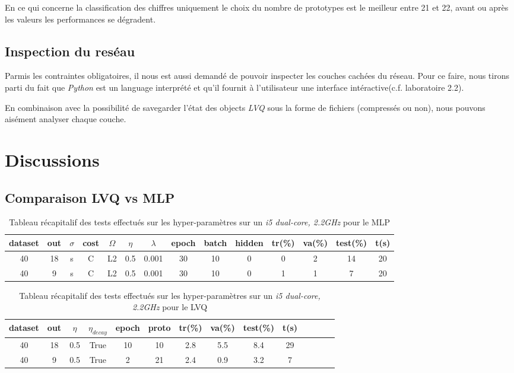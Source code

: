 \documentclass[11pt]{article}
\begin{document}
En ce qui concerne la classification des chiffres uniquement le choix
du nombre de prototypes est le meilleur entre 21 et 22, avant ou apr\`es les
valeurs les performances se d\'egradent.
\newpage

\subsection{Inspection du res\'eau}
Parmis les contraintes obligatoires, il nous est aussi demand\'e de pouvoir
inspecter les couches cach\'ees du r\'eseau. Pour ce faire, nous tirons parti du
fait que {\em Python} est un language interpr\'et\'e et qu'il fournit \`a
l'utilisateur une interface int\'eractive(c.f. laboratoire 2.2).

En combinaison avec la possibilit\'e de savegarder l'\'etat des
objects {\em LVQ} sous la forme de fichiers (compress\'es ou non), nous
pouvons ais\'ement analyser chaque couche.




\section{Discussions}
\subsection{Comparaison LVQ vs MLP}
\begin{table}[h]
	\centering
	\begin{tabular}{|c|c|c|c|c|c|c|c|c|c|c|c|c|c|}
		\hline
		dataset & out & $\sigma$  & cost & $\Omega$ & $\eta$ & $\lambda$ &
			epoch  & batch & hidden & tr(\%) & va(\%) & test(\%) & t(s)\\
		\hline		
		40	& 18 & s & C & L2 & 0.5 & 0.001 & 30 & 10 & 0 & 0 & 2 & 14 & 20 \\
		\hline
		40	& 9 & s & C & L2 & 0.5 & 0.001 & 30 & 10 & 0 & 1 & 1 & 7 & 20 \\
		\hline
\end{tabular}
  \caption{Tableau r\'ecapitalif des tests effectu\'es sur les
	hyper-param\`etres sur un {\em i5 dual-core, 2.2GHz} pour le MLP }
\end{table}
\begin{table}[h]
	\centering
	\begin{tabular}{|c|c|c|c|c|c|c|c|c|c|c|c|c|c|}
		\hline
		dataset & out  & $\eta$ & $\eta_{decay}$ & epoch  & proto  & tr(\%)
		& va(\%) & test(\%) & t(s)\\
		\hline		
		40	& 18 & 0.5 & True & 10 & 10 & 2.8 & 5.5 & 8.4 & 29\\
		\hline
		40	& 9 & 0.5 & True & 2 & 21 & 2.4 & 0.9 & 3.2 & 7\\
		\hline
\end{tabular}
  \caption{Tableau r\'ecapitalif des tests effectu\'es sur les
	hyper-param\`etres sur un {\em i5 dual-core, 2.2GHz} pour le LVQ }
\end{table}
\end{document}
